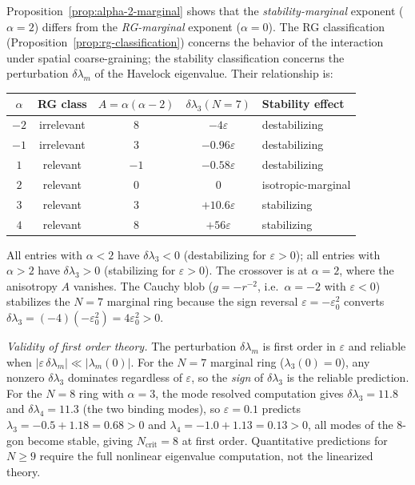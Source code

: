 \begin{remark}
\label{rem:rg-vs-stab}
Proposition~\ref{prop:alpha-2-marginal} shows that the
\emph{stability-marginal} exponent ($\alpha = 2$) differs from
the \emph{RG-marginal} exponent ($\alpha = 0$).  The RG
classification (Proposition~\ref{prop:rg-classification}) concerns
the behavior of the interaction under spatial coarse-graining;
the stability classification concerns the perturbation
$\delta\lambda_m$ of the Havelock eigenvalue.  Their relationship is:

\smallskip
\begin{center}
\begin{tabular}{ccccl}
\toprule
$\alpha$ & RG class & $A = \alpha(\alpha{-}2)$ &
  $\delta\lambda_3(N{=}7)$ & Stability effect \\
\midrule
$-2$ & irrelevant & $8$ & $-4\varepsilon$ & destabilizing \\
$-1$ & irrelevant & $3$ & $-0.96\varepsilon$ & destabilizing \\
$1$  & relevant   & $-1$ & $-0.58\varepsilon$ & destabilizing \\
$2$  & relevant   & $0$ & $0$ & isotropic-marginal \\
$3$  & relevant   & $3$ & $+10.6\varepsilon$ & stabilizing \\
$4$  & relevant   & $8$ & $+56\varepsilon$ & stabilizing \\
\bottomrule
\end{tabular}
\end{center}
\smallskip

\noindent
All entries with $\alpha < 2$ have $\delta\lambda_3 < 0$
(destabilizing for $\varepsilon > 0$); all entries with
$\alpha > 2$ have $\delta\lambda_3 > 0$ (stabilizing for
$\varepsilon > 0$).  The crossover is at $\alpha = 2$, where
the anisotropy $A$ vanishes.
The Cauchy blob
($g = -r^{-2}$, i.e.\ $\alpha = -2$ with $\varepsilon < 0$)
stabilizes the $N = 7$ marginal ring because the sign reversal
$\varepsilon = -\varepsilon_0^2$ converts $\delta\lambda_3
= (-4)(-\varepsilon_0^2) = 4\varepsilon_0^2 > 0$.
\end{remark}

\noindent\emph{Validity of first order theory.}
The perturbation $\delta\lambda_m$ is first order in $\varepsilon$
and reliable when $|\varepsilon\,\delta\lambda_m| \ll |\lambda_m(0)|$.
For the $N = 7$ marginal ring ($\lambda_3(0) = 0$), any nonzero
$\delta\lambda_3$ dominates regardless of $\varepsilon$, so the
\emph{sign} of $\delta\lambda_3$ is the reliable prediction.
For the $N = 8$ ring with $\alpha = 3$, the mode resolved
computation gives $\delta\lambda_3 = 11.8$ and
$\delta\lambda_4 = 11.3$ (the two binding modes), so
$\varepsilon = 0.1$ predicts $\lambda_3 = -0.5 + 1.18 = 0.68 > 0$
and $\lambda_4 = -1.0 + 1.13 = 0.13 > 0$, all modes of the $8$-gon
become stable, giving $N_{\mathrm{crit}} = 8$ at first order.
Quantitative predictions for $N \ge 9$ require the full nonlinear
eigenvalue computation, not the linearized theory.


